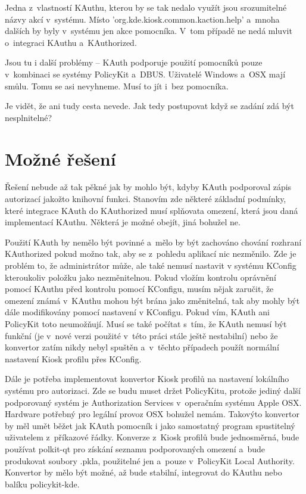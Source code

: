 Jedna z~vlastností KAuthu, kterou by se tak nedalo využít jsou srozumitelné
názvy akcí v~systému. Místo 'org.kde.kiosk.common.kaction.help' a~mnoha dalších
by byly v~systému jen akce pomocníka. V~tom případě ne nedá mluvit o~integraci
KAuthu a~KAuthorized.


Jsou tu i další problémy -- KAuth podporuje použití pomocníků pouze v~kombinaci
se systémy PolicyKit a~DBUS. Uživatelé Windows a~OSX mají smůlu. Tomu se asi
nevyhneme. Musí to jít i~bez pomocníka.


Je vidět, že ani tudy cesta nevede. Jak tedy postupovat když se zadání zdá být
nesplnitelné?


\section{Možné řešení}\label{mozres}
Řešení nebude až tak pěkné jak by mohlo být, kdyby KAuth podporoval zápis
autorizací jakožto knihovní funkci. Stanovím zde některé základní podmínky,
které integrace KAuth do KAuthorized musí splňovata omezení, která jsou daná
implementací KAuthu. Některá je možné obejít, jiná bohužel ne.

Použití KAuth by nemělo být povinné a~mělo by být zachováno chování rozhraní
KAuthorized pokud možno tak, aby se z~pohledu aplikací nic nezměnilo. Zde je
problém to, že administrátor může, ale také nemusí nastavit v systému KConfig
kteroukoliv položku jako nezměnitelnou. Pokud vložím kontrolu oprávnění pomocí
KAuthu před kontrolu pomocí KConfigu, musím nějak zaručit, že omezení známá
v~KAuthu mohou být brána jako změnitelná, tak aby mohly být dále modifikovány
pomocí nastavení v KConfigu. Pokud vím, KAuth ani PolicyKit toto neumožňují.
Musí se také počítat s~tím, že KAuth nemusí být funkční (je v~nové verzi použité
v~této práci stále ještě nestabilní) nebo že konvertor zatím nikdy nebyl
spuštěn a~v~těchto případech použít normální nastavení Kiosk profilu přes
KConfig.

Dále je potřeba implementovat konvertor Kiosk profilů na nastavení lokálního
systému pro autorizaci. Zde se budu muset držet PolicyKitu, protože jediný další
podporovaný systém je Authorization Services v~operačním systému Apple OSX.
Hardware potřebný pro legální provoz OSX bohužel nemám.
Takovýto konvertor by měl umět běžet jak KAuth pomocník i jako samostatný
program spustitelný uživatelem z~příkazové řádky. Konverze z~Kiosk profilů
bude jednosměrná, bude používat polkit-qt pro získání seznamu podporovaných
omezení a~bude produkovat soubory .pkla, použitelné jen a~pouze v~PolicyKit
Local Authority. Konvertor by mělo být možné, až bude stabilní, integrovat
do KAuthu nebo balíku policykit-kde.
    
